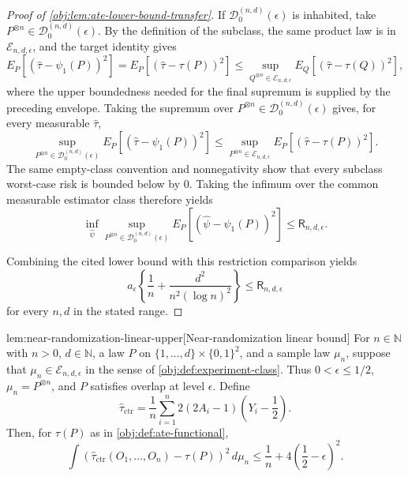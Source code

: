 \documentclass[11pt]{article}
\begin{document}
\begin{proof}[Proof of \cref{obj:lem:ate-lower-bound-transfer}]
If \(\mathcal D_0^{(n,d)}(\epsilon)\) is inhabited, take \(P^{\otimes n}\in\mathcal D_0^{(n,d)}(\epsilon)\).  By the definition of the subclass, the same product law is in \(\mathcal E_{n,d,\epsilon}\), and the target identity gives
\[
E_P\!\left[(\widehat\tau-\psi_1(P))^2\right]
=
E_P\!\left[(\widehat\tau-\tau(P))^2\right]
\le
\sup_{Q^{\otimes n}\in\mathcal E_{n,d,\epsilon}}
E_Q\!\left[(\widehat\tau-\tau(Q))^2\right],
\]
where the upper boundedness needed for the final supremum is supplied by the preceding envelope.  Taking the supremum over \(P^{\otimes n}\in\mathcal D_0^{(n,d)}(\epsilon)\) gives, for every measurable \(\widehat\tau\),
\[
\sup_{P^{\otimes n}\in\mathcal D_0^{(n,d)}(\epsilon)}
E_P\!\left[(\widehat\tau-\psi_1(P))^2\right]
\le
\sup_{P^{\otimes n}\in\mathcal E_{n,d,\epsilon}}
E_P\!\left[(\widehat\tau-\tau(P))^2\right].
\]
The same empty-class convention and nonnegativity show that every subclass worst-case risk is bounded below by \(0\).  Taking the infimum over the common measurable estimator class therefore yields
\[
\inf_{\widehat\psi}
\sup_{P^{\otimes n}\in\mathcal D_0^{(n,d)}(\epsilon)}
E_P\!\left[(\widehat\psi-\psi_1(P))^2\right]
\le
\mathsf R_{n,d,\epsilon}.
\]

Combining the cited lower bound with this restriction comparison yields
\[
a_\epsilon\left\{\frac1n+\frac{d^2}{n^2(\log n)^2}\right\}
\le
\mathsf R_{n,d,\epsilon}
\]
for every \(n,d\) in the stated range.
\end{proof}

\begin{lemmav}{lem:near-randomization-linear-upper}[Near-randomization linear bound]
For \(n\in\mathbb N\) with \(n>0\), \(d\in\mathbb N\), a law \(P\) on \(\{1,\ldots,d\}\times\{0,1\}^2\), and a sample law \(\mu_n\), suppose that \(\mu_n\in\mathcal E_{n,d,\epsilon}\) in the sense of \cref{obj:def:experiment-class}. Thus \(0<\epsilon\le 1/2\), \(\mu_n=P^{\otimes n}\), and \(P\) satisfies overlap at level \(\epsilon\). Define
\[
\widehat\tau_{\mathrm{ctr}}
=
\frac1n\sum_{i=1}^n
2(2A_i-1)\left(Y_i-\frac12\right).
\]
Then, for \(\tau(P)\) as in \cref{obj:def:ate-functional},
\[
\int
\left(\widehat\tau_{\mathrm{ctr}}(O_1,\ldots,O_n)-\tau(P)\right)^2
\,d\mu_n
\le
\frac1n+4\left(\frac12-\epsilon\right)^2 .
\]
\end{lemmav}
\end{document}

